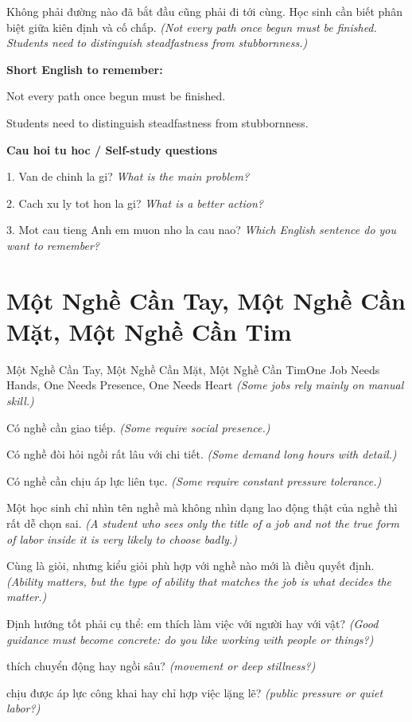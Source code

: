 \begin{baihoc}
Không phải đường nào đã bắt đầu cũng phải đi tới cùng. Học sinh cần biết phân biệt giữa kiên định và cố chấp.
\textit{(Not every path once begun must be finished. Students need to distinguish steadfastness from stubbornness.)}
\end{baihoc}

\begin{ghinhoanh}
\textbf{Short English to remember:}

Not every path once begun must be finished.

Students need to distinguish steadfastness from stubbornness.

\end{ghinhoanh}

\begin{tuhocnhanh}
\textbf{Cau hoi tu hoc / Self-study questions}

1. Van de chinh la gi? \textit{What is the main problem?}

2. Cach xu ly tot hon la gi? \textit{What is a better action?}

3. Mot cau tieng Anh em muon nho la cau nao? \textit{Which English sentence do you want to remember?}
\end{tuhocnhanh}
\ngancach

\section{Một Nghề Cần Tay, Một Nghề Cần Mặt, Một Nghề Cần Tim}
\begin{truyen}{Một Nghề Cần Tay, Một Nghề Cần Mặt, Một Nghề Cần Tim}{One Job Needs Hands, One Needs Presence, One Needs Heart}
\textit{(Some jobs rely mainly on manual skill.)}

Có nghề cần giao tiếp.
\textit{(Some require social presence.)}

Có nghề đòi hỏi ngồi rất lâu với chi tiết.
\textit{(Some demand long hours with detail.)}

Có nghề cần chịu áp lực liên tục.
\textit{(Some require constant pressure tolerance.)}

Một học sinh chỉ nhìn tên nghề mà không nhìn dạng lao động thật của nghề thì rất dễ chọn sai.
\textit{(A student who sees only the title of a job and not the true form of labor inside it is very likely to choose badly.)}

Cùng là giỏi, nhưng kiểu giỏi phù hợp với nghề nào mới là điều quyết định.
\textit{(Ability matters, but the type of ability that matches the job is what decides the matter.)}

Định hướng tốt phải cụ thể: em thích làm việc với người hay với vật?
\textit{(Good guidance must become concrete: do you like working with people or things?)}

thích chuyển động hay ngồi sâu?
\textit{(movement or deep stillness?)}

chịu được áp lực công khai hay chỉ hợp việc lặng lẽ?
\textit{(public pressure or quiet labor?)}

\end{truyen}

